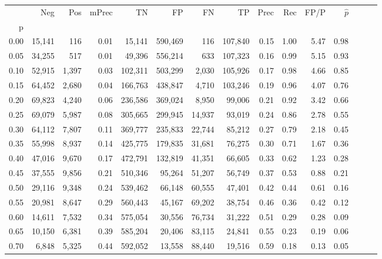 \begin{tabular}{rrrrrrrrrrrrrrr}
\toprule
{} &     Neg &    Pos & mPrec &       TN &       FP &       FN &       TP &  Prec &   Rec &  FP/P & $\hat{p}$ \\
p    &         &        &       &          &          &          &          &       &       &       &           \\
\midrule
0.00 &  15,141 &    116 &  0.01 &   15,141 &  590,469 &      116 &  107,840 &  0.15 &  1.00 &  5.47 &      0.98 \\
0.05 &  34,255 &    517 &  0.01 &   49,396 &  556,214 &      633 &  107,323 &  0.16 &  0.99 &  5.15 &      0.93 \\
0.10 &  52,915 &  1,397 &  0.03 &  102,311 &  503,299 &    2,030 &  105,926 &  0.17 &  0.98 &  4.66 &      0.85 \\
0.15 &  64,452 &  2,680 &  0.04 &  166,763 &  438,847 &    4,710 &  103,246 &  0.19 &  0.96 &  4.07 &      0.76 \\
0.20 &  69,823 &  4,240 &  0.06 &  236,586 &  369,024 &    8,950 &   99,006 &  0.21 &  0.92 &  3.42 &      0.66 \\
0.25 &  69,079 &  5,987 &  0.08 &  305,665 &  299,945 &   14,937 &   93,019 &  0.24 &  0.86 &  2.78 &      0.55 \\
0.30 &  64,112 &  7,807 &  0.11 &  369,777 &  235,833 &   22,744 &   85,212 &  0.27 &  0.79 &  2.18 &      0.45 \\
0.35 &  55,998 &  8,937 &  0.14 &  425,775 &  179,835 &   31,681 &   76,275 &  0.30 &  0.71 &  1.67 &      0.36 \\
0.40 &  47,016 &  9,670 &  0.17 &  472,791 &  132,819 &   41,351 &   66,605 &  0.33 &  0.62 &  1.23 &      0.28 \\
0.45 &  37,555 &  9,856 &  0.21 &  510,346 &   95,264 &   51,207 &   56,749 &  0.37 &  0.53 &  0.88 &      0.21 \\
0.50 &  29,116 &  9,348 &  0.24 &  539,462 &   66,148 &   60,555 &   47,401 &  0.42 &  0.44 &  0.61 &      0.16 \\
0.55 &  20,981 &  8,647 &  0.29 &  560,443 &   45,167 &   69,202 &   38,754 &  0.46 &  0.36 &  0.42 &      0.12 \\
0.60 &  14,611 &  7,532 &  0.34 &  575,054 &   30,556 &   76,734 &   31,222 &  0.51 &  0.29 &  0.28 &      0.09 \\
0.65 &  10,150 &  6,381 &  0.39 &  585,204 &   20,406 &   83,115 &   24,841 &  0.55 &  0.23 &  0.19 &      0.06 \\
0.70 &   6,848 &  5,325 &  0.44 &  592,052 &   13,558 &   88,440 &   19,516 &  0.59 &  0.18 &  0.13 &      0.05 \\

\end{tabular}
